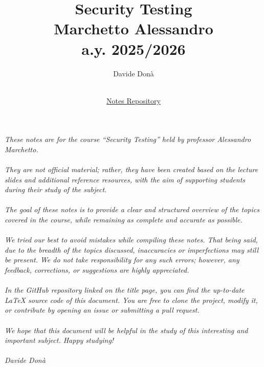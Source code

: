 \documentclass{article}
\title{\Huge \textbf{Security Testing\\} \Large{Marchetto Alessandro\\a.y. 2025/2026}}
\author{Davide Donà}
\date{
    \MonthName\ \number\year \\[0.5em]
    \small\textcolor{gray}{\href{https://github.com/davide-dona/Security-Testing}{Notes Repository}}
}
\begin{document}
\maketitle

\newpage
\textit{
These notes are for the course ``Security Testing'' held by professor Alessandro Marchetto. \\\\
They are not official material; rather, they have been created based on the lecture slides and additional reference resources, with the aim of supporting students during their study of the subject.\\\\
The goal of these notes is to provide a clear and structured overview of the topics covered in the course, while remaining as complete and accurate as possible.\\\\
We tried our best to avoid mistakes while compiling these notes. That being said, due to the breadth of the topics discussed, inaccuracies or imperfections may still be present. We do not take responsibility for any such errors; however, any feedback, corrections, or suggestions are highly appreciated.\\\\
In the GitHub repository linked on the title page, you can find the up-to-date \LaTeX{} source code of this document. You are free to clone the project, modify it, or contribute by opening an issue or submitting a pull request.\\\\
We hope that this document will be helpful in the study of this interesting and important subject. Happy studying! \\\\
Davide Donà
}
\newpage

\tableofcontents
\newpage






















\end{document}
